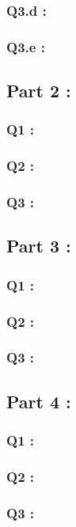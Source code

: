 \documentclass[fleqn]{article}
\begin{document}
\subsubsection*{Q3.d :}



\subsubsection*{Q3.e :}


\newpage

\subsection*{Part 2 :}

\subsubsection*{Q1 :}


\subsubsection*{Q2 :}


\subsubsection*{Q3 :}


\newpage

\subsection*{Part 3 :}

\subsubsection*{Q1 :}


\subsubsection*{Q2 :}


\subsubsection*{Q3 :}


\newpage
\subsection*{Part 4 :}

\subsubsection*{Q1 :}


\subsubsection*{Q2 :}


\subsubsection*{Q3 :}

\end{document}
